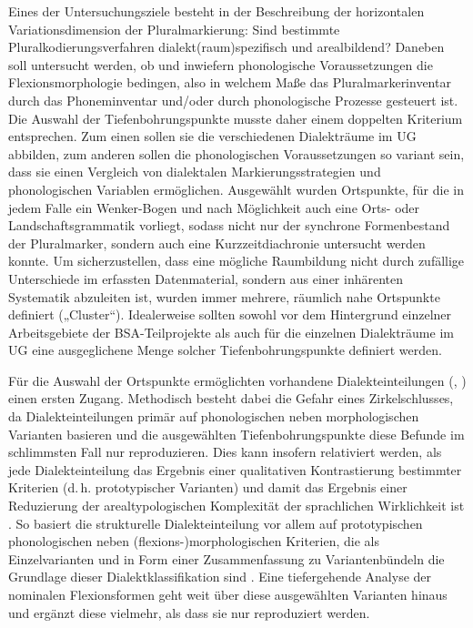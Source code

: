 Eines der Untersuchungsziele besteht in der Beschreibung der horizontalen Variationsdimension der Pluralmarkierung: Sind bestimmte Pluralkodierungsverfahren dialekt(raum)spezifisch und arealbildend? Daneben soll untersucht werden, ob und inwiefern phonologische Voraussetzungen die Flexionsmorphologie bedingen, also in welchem Maße das Pluralmarkerinventar durch das Phoneminventar und/oder durch phonologische Prozesse gesteuert ist. Die Auswahl der Tiefenbohrungspunkte musste daher einem doppelten Kriterium entsprechen. Zum einen sollen sie die verschiedenen Dialekträume im UG abbilden, zum anderen sollen die phonologischen Voraussetzungen so variant sein, dass sie einen Vergleich von dialektalen Markierungsstrategien und phonologischen Variablen ermöglichen. Ausgewählt wurden Ortspunkte, für die in jedem Falle ein Wenker-Bogen und nach Möglichkeit auch eine Orts- oder Landschaftsgrammatik vorliegt, sodass nicht nur der synchrone Formenbestand der Pluralmarker, sondern auch eine Kurzzeitdiachronie untersucht werden konnte. Um sicherzustellen, dass eine mögliche Raumbildung nicht durch zufällige Unterschiede im erfassten Datenmaterial, sondern aus einer inhärenten Systematik abzuleiten ist, wurden immer mehrere, räumlich nahe Ortspunkte definiert („Cluster“). Idealerweise sollten sowohl vor dem Hintergrund einzelner Arbeitsgebiete der BSA-Teilprojekte als auch für die einzelnen Dialekträume im UG eine ausgeglichene Menge solcher Tiefenbohrungspunkte definiert werden.

Für die Auswahl der Ortspunkte ermöglichten vorhandene Dialekteinteilungen (\citealt{Wiesinger1983b}, \citealt{Lameli2013}) einen ersten Zugang. Methodisch besteht dabei die Gefahr eines Zirkelschlusses, da Dialekteinteilungen primär auf phonologischen neben morphologischen Varianten basieren und die ausgewählten Tiefenbohrungspunkte diese Befunde im schlimmsten Fall nur reproduzieren. Dies kann insofern relativiert werden, als jede Dialekteinteilung das Ergebnis einer qualitativen Kontrastierung bestimmter Kriterien (d.\,h. prototypischer Varianten) und damit das Ergebnis einer Reduzierung der arealtypologischen Komplexität der sprachlichen Wirklichkeit ist \citep[8]{Lameli2013}. So basiert die strukturelle Dialekteinteilung  vor allem auf prototypischen phonologischen neben (flexions-)morphologischen Kriterien, die als Einzelvarianten und in Form einer Zusammenfassung zu Variantenbündeln die Grundlage dieser Dialektklassifikation sind \citep[812--814]{Wiesinger1983b}. Eine tiefergehende Analyse der nominalen Flexionsformen geht weit über diese ausgewählten Varianten hinaus und ergänzt diese vielmehr, als dass sie nur reproduziert werden.\largerpage

